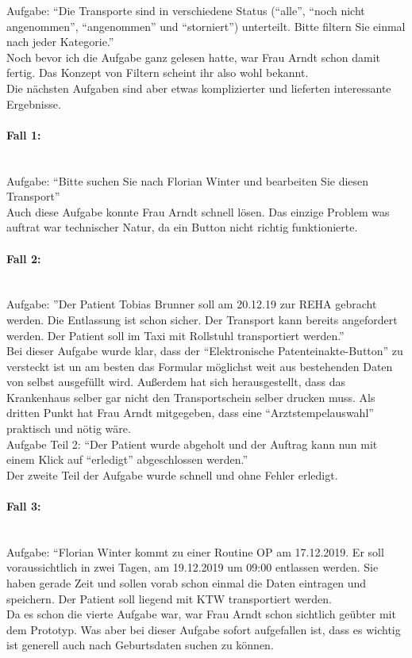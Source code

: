 \documentclass[a4paper, ngerman, 12pt]{scrartcl}
\begin{document}
Aufgabe: “Die Transporte sind in verschiedene Status (“alle”, “noch nicht angenommen”, “angenommen” und “storniert”) unterteilt. Bitte filtern Sie einmal nach jeder Kategorie.”\\

Noch bevor ich die Aufgabe ganz gelesen hatte, war Frau Arndt schon damit fertig. Das Konzept von Filtern scheint ihr also wohl bekannt.\\
Die nächsten Aufgaben sind aber etwas komplizierter und lieferten interessante Ergebnisse.\\
\paragraph{Fall 1:}\leavevmode\\
Aufgabe: “Bitte suchen Sie nach Florian Winter und bearbeiten Sie diesen Transport”\\

Auch diese Aufgabe konnte Frau Arndt schnell lösen. Das einzige Problem was auftrat war technischer Natur, da ein Button nicht richtig funktionierte.\\
\paragraph{Fall 2:}\leavevmode\\
Aufgabe: ”Der Patient Tobias Brunner soll am 20.12.19 zur REHA gebracht werden. Die Entlassung ist schon sicher. Der Transport kann bereits angefordert werden. Der Patient soll im Taxi mit Rollstuhl transportiert werden.”\\

Bei dieser Aufgabe wurde klar, dass der ``Elektronische Patenteinakte-Button'' zu versteckt ist un am besten das Formular möglichst weit aus bestehenden Daten von selbst ausgefüllt wird. Außerdem hat sich herausgestellt, dass das Krankenhaus selber gar nicht den Transportschein selber drucken muss. Als dritten Punkt hat Frau Arndt mitgegeben, dass eine ``Arztstempelauswahl'' praktisch und nötig wäre.\\

Aufgabe Teil 2: “Der Patient wurde abgeholt und der Auftrag kann nun mit einem Klick auf ``erledigt'' abgeschlossen werden.”\\

Der zweite Teil der Aufgabe wurde schnell und ohne Fehler erledigt.
\paragraph{Fall 3:}\leavevmode\\
Aufgabe: “Florian Winter kommt zu einer Routine OP am 17.12.2019. Er soll voraussichtlich in zwei Tagen, am 19.12.2019 um 09:00 entlassen werden. Sie haben gerade Zeit und sollen vorab schon einmal die Daten eintragen und speichern. Der Patient soll liegend mit KTW transportiert werden.\\
Da es schon die vierte Aufgabe war, war Frau Arndt schon sichtlich geübter mit dem Prototyp.
Was aber bei dieser Aufgabe sofort aufgefallen ist, dass es wichtig ist generell auch nach Geburtsdaten suchen zu können.\\
\end{document}
